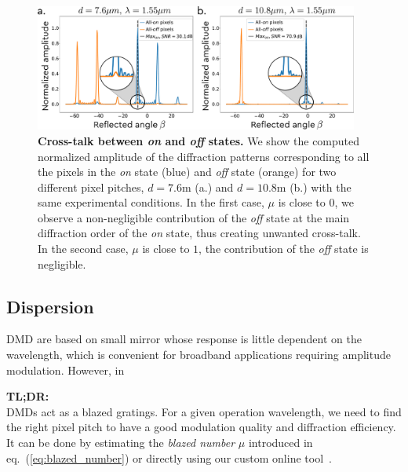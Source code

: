 \documentclass[12pt]{iopart}
\begin{document}
\begin{figure}
  \centering
  \includegraphics[width = 0.95\textwidth]{images/xtalk.pdf}
  \caption{
    \textbf{Cross-talk between {\em on} and {\em off} states.}
    We show the computed normalized amplitude of the diffraction patterns corresponding
    to all the pixels in the {\em on} state (blue)
    and {\em off} state (orange)
    for two different pixel pitches,
    $d = 7.6$\textmu m (a.)
    and $d = 10.8$\textmu m (b.)
    with the same experimental conditions.
    In the first case, $\mu$ is close to $0$,
    we observe a non-negligible contribution of the {\em off} state
    at the main diffraction order of the {\em on} state,
    thus creating unwanted cross-talk.
    In the second case, $\mu$ is close to $1$,
    the contribution of the {\em off} state is negligible.
  }
  \label{fig:xtalk}
\end{figure}

\subsection{Dispersion}

DMD are based on small mirror whose response is little dependent on the wavelength,
which is convenient for broadband applications requiring amplitude modulation.
However, in


\begin{tldr}
  \textbf{TL;DR:}\\
  DMDs act as a blazed gratings.
  For a given operation wavelength,
  we need to find the right pixel pitch
  to have a good modulation quality
  and diffraction efficiency.
  It can be done by estimating the \textit{blazed number} $\mu$ introduced in eq.~(\ref{eq:blazed_number})
  or directly using our custom online tool~\cite{popoffDMDDiffractionTool}.
\end{tldr}
\end{document}
